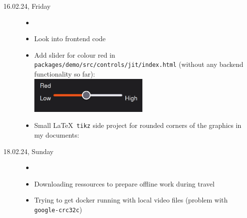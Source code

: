 \documentclass[a4, 11pt]{scrartcl}
\begin{document}
\begin{description}
\item[16.02.24, Friday]	
\begin{itemize}
	\item[]
	\item Look into frontend code
	\item Add slider for colour red in \texttt{packages/demo/src/controls/jit/index.html} (without any backend functionality so far): \\
	\includegraphics[width=5.9cm]{slider_red2.png}
	\item Small \LaTeX \ \texttt{tikz} side project for rounded corners of the graphics in my documents: \\
	
\end{itemize}
	
	
	
	
\item[18.02.24, Sunday]	
\begin{itemize}
	\item[]
	\item Downloading ressources to prepare offline work during travel
	\item Trying to get docker running with local video files (problem with \texttt{google-crc32c})
	
\end{itemize}
	
	
	
	
\end{description}	



	
\end{document}
